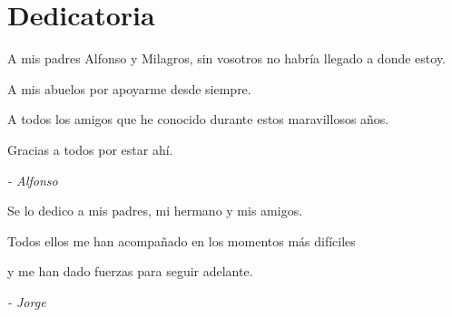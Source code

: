 
\chapter*{Dedicatoria}


\small

\hfill A mis padres Alfonso y Milagros, sin vosotros no habría llegado a donde estoy.

\hfill A mis abuelos por apoyarme desde siempre.

\hfill A todos los amigos que he conocido durante estos maravillosos años.

\hfill Gracias a todos por estar ahí.

\hfill \emph{- Alfonso}

\hfill 

\hfill Se lo dedico a mis padres, mi hermano y mis amigos.

\hfill Todos ellos me han acompañado en los momentos más difíciles

\hfill y me han dado fuerzas para seguir adelante.

\hfill \emph{- Jorge}


\thispagestyle{empty}\mbox{}